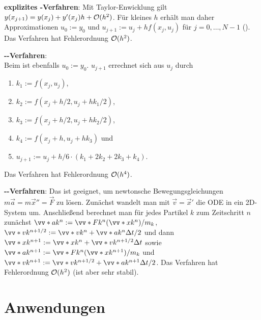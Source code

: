 \textbf{explizites -Verfahren}:
Mit Taylor-Enwicklung gilt $y(x_{j+1}) = y(x_j) + y'(x_j) h + \mathcal{O}(h^2)$.
Für kleines $h$ erhält man daher Approximationen
$u_0 := y_0$ und $u_{j+1} := u_j + h f(x_j, u_j)$ für $j = 0, \dotsc, N-1$
().
Das Verfahren hat Fehlerordnung $\mathcal{O}(h^2)$.

\linie

\textbf{--Verfahren}:\\
Beim  ist ebenfalls $u_0 := y_0$.
$u_{j+1}$ errechnet sich aus $u_j$ durch
\begin{enumerate}
    \item
    $k_1 := f(x_j, u_j)$,

    \item
    $k_2 := f(x_j + h/2, u_j + hk_1/2)$,

    \item
    $k_3 := f(x_j + h/2, u_j + hk_2/2)$,

    \item
    $k_4 := f(x_j + h, u_j + hk_3)$ und

    \item
    $u_{j+1} := u_j + h/6 \cdot (k_1 + 2k_2 + 2k_3 + k_4)$.
\end{enumerate}
Das Verfahren hat Fehlerordnung $\mathcal{O}(h^4)$.

\linie

\textbf{--Verfahren}:
Das  ist geeignet,
um newtonsche Bewegungsgleichungen $m\vec{a} = m\vec{x}'' = \vec{F}$ zu lösen.
Zunächst wandelt man mit $\vec{v} = \vec{x}'$ die ODE in ein 2D-System um.
Anschließend berechnet man für jedes Partikel $k$ zum Zeitschritt $n$ zunächst
$\vecs{a}{k}^n := \vecs{F}{k}^n(\vecs{x}{k}^n)/m_k$,
$\vecs{v}{k}^{n+1/2} := \vecs{v}{k}^n + \vecs{a}{k}^n \Delta t/2$ und dann
$\vecs{x}{k}^{n+1} := \vecs{x}{k}^n + \vecs{v}{k}^{n+1/2} \Delta t$ sowie
$\vecs{a}{k}^{n+1} := \vecs{F}{k}^n(\vecs{x}{k}^{n+1})/m_k$ und
$\vecs{v}{k}^{n+1} := \vecs{v}{k}^{n+1/2} + \vecs{a}{k}^{n+1} \Delta t/2$.
Das Verfahren hat Fehlerordnung $\mathcal{O}(h^2)$ (ist aber sehr stabil).

\pagebreak

\section{%
    Anwendungen%
}

